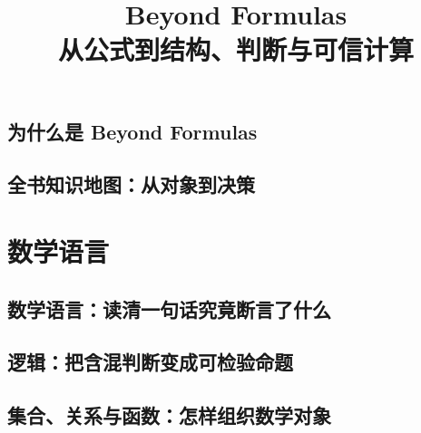 \documentclass[UTF8,openany]{ctexbook}
\title{Beyond Formulas\\[0.8em]\large 从公式到结构、判断与可信计算}
\author{}
\date{}
\theoremstyle{definition}
\theoremstyle{plain}
\begin{document}
\maketitle
\tableofcontents
\clearpage
\chapter*{为什么是 Beyond Formulas}
\label{ch:001}

\clearpage
\chapter*{全书知识地图：从对象到决策}
\label{ch:002}

\clearpage
\part{数学语言}
\chapter*{数学语言：读清一句话究竟断言了什么}
\label{ch:003}

\clearpage
\chapter*{逻辑：把含混判断变成可检验命题}
\label{ch:004}




\clearpage
\chapter*{集合、关系与函数：怎样组织数学对象}
\label{ch:005}





\clearpage
\end{document}

